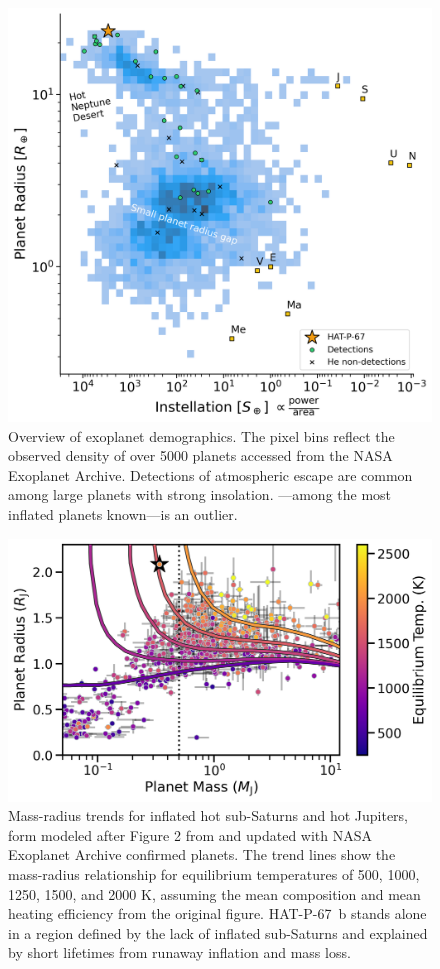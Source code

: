\documentclass[twocolumn]{aastex631}
\newcommand{\hatpb}{\object{HAT-P-67 b}}
\begin{document}
\begin{figure}
    \centering
    \includegraphics[width=\linewidth]{figures/HAT-P-67b_radius_valley.png}
    \caption{Overview of exoplanet demographics.  The pixel bins reflect the observed density of over 5000 planets accessed from the NASA Exoplanet Archive. Detections of atmospheric escape are common among large planets with strong insolation.  \hatpb---among the most inflated planets known---is an outlier.}
    \label{fig:instellation}
\end{figure}

\begin{figure}
    \includegraphics[width=\linewidth]{figures/tf2018_fig2_update2023_HAT.png}
    \caption{Mass-radius trends for inflated hot sub-Saturns and hot Jupiters, form modeled after Figure 2 from \citet{2018AJ....155..214T} and updated with NASA Exoplanet Archive confirmed planets.  The trend lines show the mass-radius relationship for equilibrium temperatures of 500, 1000, 1250, 1500, and 2000 K, assuming the mean composition and mean heating efficiency from the original figure.  HAT-P-67~b stands alone in a region defined by the lack of inflated sub-Saturns and explained by short lifetimes from runaway inflation and mass loss.}
    \label{fig:ThornFortUpdated}
\end{figure}
\end{document}
